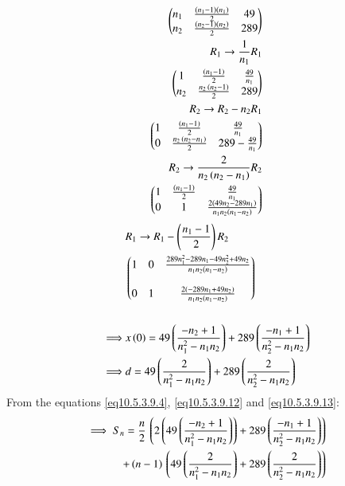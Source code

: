 \documentclass[journal,12pt,twocolumn]{IEEEtran}
\theoremstyle{remark}
\begin{document}
\begin{align}
    \begin{pmatrix}
        n_1&\frac{\left(n_1-1\right)\left(n_1\right)}{2}&49\\
        n_2&\frac{\left(n_2-1\right)\left(n_2\right)}{2}&289
    \end{pmatrix}
    \\R_1\rightarrow\frac{1}{n_1}R_1\notag\\
    \begin{pmatrix}
        1&\frac{\left(n_1-1\right)}{2}&\frac{49}{n_1}\\
        n_2&\frac{n_2\,\left(n_2-1\right)}{2}&289
    \end{pmatrix}\\
    R_2 \rightarrow R_2-n_2R_1\notag\\
    \begin{pmatrix}
        1&\frac{\left(n_1-1\right)}{2}&\frac{49}{n_1}\\
        0&\frac{n_2\,\left(n_2-n_1\right)}{2}&289-\frac{49}{n_1}
    \end{pmatrix}\\
    R_2\rightarrow\frac{2}{n_2\left(n_2-n_1\right)}R_2\notag\\
    \begin{pmatrix}
        1&\frac{\left(n_1-1\right)}{2}&\frac{49}{n_1}\\
        0&1&\frac{2\left(49n_2-289 n_1\right)}{n_1 n_2\left(n_1-n_2\right)}
    \end{pmatrix}
\end{align}
\begin{align}
    &R_1\rightarrow R_1-\left(\frac{n_1-1}{2}\right) R_2\notag\\
    &\begin{pmatrix}
        1 & 0 & \frac{289 n_1^2-289 n_1-49n_2^2+49 n_2}{n_1 n_2\left(n_1-n_2\right)} \\\\
        0 & 1 & \frac{2\left(-289 n_1+49 n_2\right)}{n_1 n_2\left(n_1-n_2\right)}
    \end{pmatrix}\\\notag\\
    \implies &x\left(0\right)=49\left(\frac{-n_2+1}{n_1^2-n_1n_2}\right)+289\left(\frac{-n_1+1}{n_2^2-n_1n_2}\right)\label{eq10.5.3.9.12}\\
    \implies &d=49\left(\frac{2}{n_1^2-n_1n_2}\right)+289\left(\frac{2}{n_2^2-n_1n_2}\right)\label{eq10.5.3.9.13}
\end{align}
 From the equations \ref{eq10.5.3.9.4}, \ref{eq10.5.3.9.12} and \ref{eq10.5.3.9.13}:
 \begin{align}
     \implies S_n = \frac{n}{2}\,\left(2\left(49\left(\frac{-n_2+1}{n_1^2-n_1n_2}\right)\right)+289\left(\frac{-n_1+1}{n_2^2-n_1n_2}\right)\right)\notag\\
     +\left(n-1\right)\,\left(49\left(\frac{2}{n_1^2-n_1n_2}\right)+289\left(\frac{2}{n_2^2-n_1n_2}\right)\right)
 \end{align}
\end{document}
